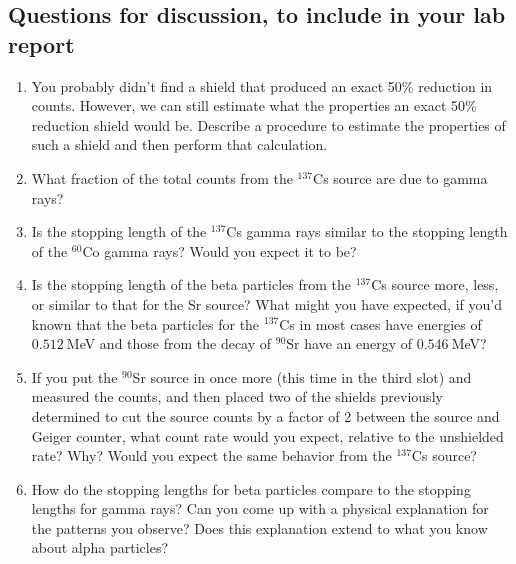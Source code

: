 \subsection{Questions for discussion, to include in your lab report}

\begin{enumerate}
	
	\item You probably didn't find a shield that produced an exact 50\% reduction in counts.
	However, we can still estimate what the properties an exact 50\% reduction shield would be. Describe a procedure to estimate the properties of such a shield and then perform that calculation.
	
	\item What fraction of the total counts from the $^{137}$Cs source are due to gamma rays?
	
	\item Is the stopping length of the $^{137}$Cs gamma rays similar to the stopping length of
	the $^{60}$Co gamma rays? Would you expect it to be?
	
	\item Is the stopping length of the beta particles from the $^{137}$Cs source more, less, or
	similar to that for the Sr source? What might you have expected, if you'd known
	that the beta particles for the $^{137}$Cs in most cases have energies of $0.512\:$MeV and
	those from the decay of $^{90}$Sr have an energy of $0.546\:$MeV?
	
	\item If you put the $^{90}$Sr source in once more (this time in the third slot) and measured
	the counts, and then placed two of the shields previously determined to cut the source counts by a factor of 2 between the source and Geiger counter, what count rate would you expect, relative to the unshielded rate?
	Why?
	Would you expect the same behavior from the $^{137}$Cs source?
	
	\item How do the stopping lengths for beta particles compare to the stopping lengths for gamma rays? Can you come up with a physical explanation for the patterns you observe? Does this explanation extend to what you know about alpha particles?
\end{enumerate}